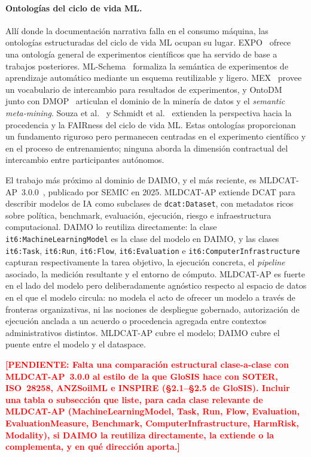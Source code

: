 \documentclass[Afour,sagev,times]{sagej}
\newcommand{\code}[1]{\texttt{#1}}
\newcommand{\TODO}[1]{\textcolor{red}{\textbf{[PENDIENTE: #1]}}}
\begin{document}
\paragraph{Ontologías del ciclo de vida ML.}

Allí donde la documentación narrativa falla en el consumo máquina, las ontologías estructuradas del ciclo de vida ML ocupan su lugar. EXPO~\cite{expo} ofrece una ontología general de experimentos científicos que ha servido de base a trabajos posteriores. ML-Schema~\cite{mls} formaliza la semántica de experimentos de aprendizaje automático mediante un esquema reutilizable y ligero. MEX~\cite{mex} provee un vocabulario de intercambio para resultados de experimentos, y OntoDM~\cite{ontodm} junto con DMOP~\cite{dmop} articulan el dominio de la minería de datos y el \emph{semantic meta-mining}. Souza et al.~\cite{souza19} y Schmidt et al.~\cite{schmidt21} extienden la perspectiva hacia la procedencia y la FAIRness del ciclo de vida ML. Estas ontologías proporcionan un fundamento riguroso pero permanecen centradas en el experimento científico y en el proceso de entrenamiento; ninguna aborda la dimensión contractual del intercambio entre participantes autónomos.

El trabajo más próximo al dominio de DAIMO, y el más reciente, es MLDCAT-AP~3.0.0~\cite{mldcatap}, publicado por SEMIC en 2025. MLDCAT-AP extiende DCAT para describir modelos de IA como subclases de \code{dcat:Dataset}, con metadatos ricos sobre política, benchmark, evaluación, ejecución, riesgo e infraestructura computacional. DAIMO lo reutiliza directamente: la clase \code{it6:MachineLearningModel} es la clase del modelo en DAIMO, y las clases \code{it6:Task}, \code{it6:Run}, \code{it6:Flow}, \code{it6:Evaluation} e \code{it6:ComputerInfrastructure} capturan respectivamente la tarea objetivo, la ejecución concreta, el \emph{pipeline} asociado, la medición resultante y el entorno de cómputo. MLDCAT-AP es fuerte en el lado del modelo pero deliberadamente agnóstico respecto al espacio de datos en el que el modelo circula: no modela el acto de ofrecer un modelo a través de fronteras organizativas, ni las nociones de despliegue gobernado, autorización de ejecución anclada a un acuerdo o procedencia agregada entre contextos administrativos distintos. MLDCAT-AP cubre el modelo; DAIMO cubre el puente entre el modelo y el dataspace.

\TODO{Falta una comparación estructural clase-a-clase con MLDCAT-AP~3.0.0 al estilo de la que GloSIS hace con SOTER, ISO~28258, ANZSoilML e INSPIRE (§2.1--§2.5 de GloSIS). Incluir una tabla o subsección que liste, para cada clase relevante de MLDCAT-AP (MachineLearningModel, Task, Run, Flow, Evaluation, EvaluationMeasure, Benchmark, ComputerInfrastructure, HarmRisk, Modality), si DAIMO la reutiliza directamente, la extiende o la complementa, y en qué dirección aporta.}
\end{document}
